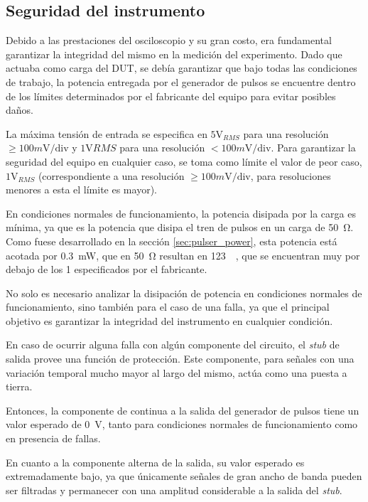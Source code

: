 \subsection{Seguridad del instrumento}

Debido a las prestaciones del osciloscopio y su gran costo, era fundamental
garantizar la integridad del mismo en la medición del experimento. Dado que
actuaba como carga del DUT, se debía garantizar que bajo todas las condiciones
de trabajo, la potencia entregada por el generador de pulsos se encuentre dentro
de los límites determinados por el fabricante del equipo para evitar posibles
daños.

La máxima tensión de entrada se especifica en $5\text{V}_{RMS}$ para una
resolución $\geq100m\text{V}/\text{div}$ y $1 \text{V}{RMS}$ para una resolución
$<100 m\text{V}/\text{div}$.  Para garantizar la seguridad del equipo en
cualquier caso, se toma como límite el valor de peor caso, $1\text{V}_{RMS}$
(correspondiente a una resolución $\geq 100 m\text{V/div}$, para resoluciones
menores a esta el límite es mayor).

En condiciones normales de funcionamiento, la potencia disipada por la carga es
mínima, ya que es la potencia que disipa el tren de pulsos en un carga de
\qty{50}{\ohm}. Como fuese desarrollado en la sección \ref{sec:pulser_power},
esta potencia está acotada por \qty{0.3}{\milli\watt}, que en \qty{50}{\ohm}
resultan en \qty{123}{\milli\voltRMS}, que se encuentran muy por debajo de los
\qty{1}{\voltRMS} especificados por el fabricante.

No solo es necesario analizar la disipación de potencia en condiciones normales
de funcionamiento, sino también para el caso de una falla, ya que el principal
objetivo es garantizar la integridad del instrumento en cualquier condición.

En caso de ocurrir alguna falla con algún componente del circuito, el \textit{stub}
de salida provee una función de protección. Este componente, para señales con
una variación temporal mucho mayor al largo del mismo, actúa como una puesta a
tierra.

Entonces, la componente de continua a la salida del generador de pulsos tiene un
valor esperado de \qty{0}{\volt}, tanto para condiciones normales de
funcionamiento como en presencia de fallas.

En cuanto a la componente alterna de la salida, su valor esperado es
extremadamente bajo, ya que únicamente señales de gran ancho de banda pueden ser
filtradas y permanecer con una amplitud considerable a la salida del
\textit{stub}.

